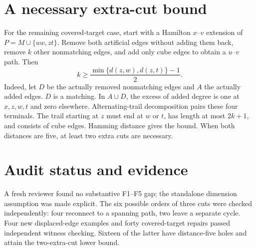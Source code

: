\documentclass[11pt]{article}
\begin{document}
\section*{A necessary extra-cut bound}
For the remaining covered-target case, start with a Hamilton $x$--$v$
extension of $P=M\cup\{uw,zt\}$. Remove both artificial edges without
adding them back, remove $k$ other nonmatching edges, and add only cube
edges to obtain a $u$--$v$ path. Then
\[
k\ge\frac{\min\{d(z,w),d(z,t)\}-1}{2}.
\]
Indeed, let $D$ be the actually removed nonmatching edges and $A$ the
actually added edges. $D$ is a matching. In $A\cup D$, the excess of added
degree is one at $x,z,w,t$ and zero elsewhere. Alternating-trail
decomposition pairs these four terminals. The trail starting at $z$ must
end at $w$ or $t$, has length at most $2k+1$, and consists of cube edges.
Hamming distance gives the bound. When both distances are five, at least
two extra cuts are necessary.

\section*{Audit status and evidence}
A fresh reviewer found no substantive F1--F5 gap; the standalone dimension
assumption was made explicit. The six possible orders of three cuts were
checked independently: four reconnect to a spanning path, two leave a
separate cycle. Four new displaced-edge examples and forty covered-target
repairs passed independent witness checking. Sixteen of the latter have
distance-five holes and attain the two-extra-cut lower bound.

\noindent{}
\end{document}
